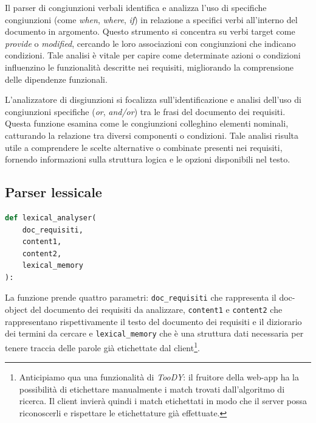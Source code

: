 \documentclass[12pt]{report}
\newcommand{\toody}{\textsl{TooDY}\xspace}
\begin{document}
Il \textsf{parser di congiunzioni verbali} identifica e analizza l'uso di specifiche congiunzioni (come \textit{when}, \textit{where}, \textit{if}) in relazione a specifici verbi all'interno del documento in argomento. Questo strumento si concentra su verbi target come \textit{provide} o \textit{modified}, cercando le loro associazioni con congiunzioni che indicano condizioni. Tale analisi è vitale per capire come determinate azioni o condizioni influenzino le funzionalità descritte nei requisiti, migliorando la comprensione delle dipendenze funzionali.

L'\textsf{analizzatore di disgiunzioni} si focalizza sull'identificazione e analisi dell'uso di congiunzioni specifiche (\textit{or}, \textit{and/or}) tra le frasi del documento dei requisiti. Questa funzione esamina come le congiunzioni colleghino elementi nominali, catturando la relazione tra diversi componenti o condizioni. Tale analisi risulta utile a comprendere le scelte alternative o combinate presenti nei requisiti, fornendo informazioni sulla struttura logica e le opzioni disponibili nel testo.


\subsection{Parser lessicale}
\label{subsec:parser_lessicale}

\begin{mdframed}
\small
\begin{lstlisting}[language=Python]
def lexical_analyser(
    doc_requisiti,
    content1,
    content2,
    lexical_memory
):
\end{lstlisting}
\end{mdframed}

\noindent La funzione prende quattro parametri: \texttt{doc\_requisiti} che rappresenta il doc-object del documento dei requisiti da analizzare, \texttt{content1} e \texttt{content2} che rappresentano rispettivamente il testo del documento dei requisiti e il diziorario dei termini da cercare e \texttt{lexical\_memory} che è una struttura dati necessaria per tenere traccia delle parole già etichettate dal client\footnote{Anticipiamo qua una funzionalità di \toody: il fruitore della web-app ha la possibilità di etichettare manualmente i match trovati dall'algoritmo di ricerca. Il client invierà quindi i match etichettati in modo che il server possa riconoscerli e rispettare le etichettature già effettuate.}.
\end{document}
